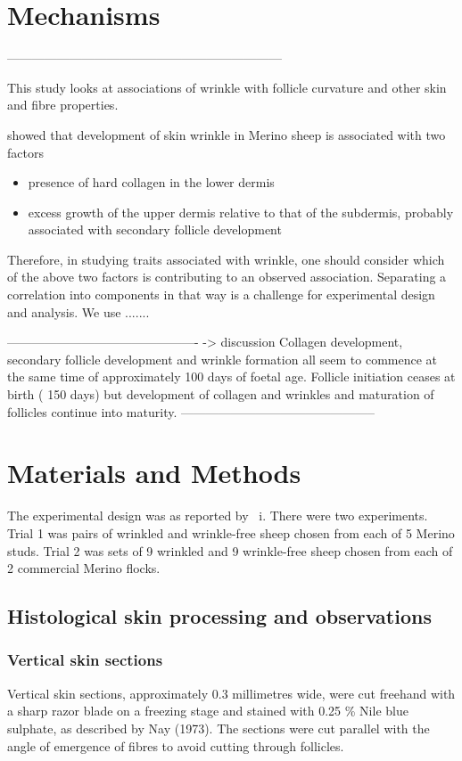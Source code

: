 \documentclass{article}
\begin{document}
\section{Mechanisms}

------------------------------------------------------------------

This study looks at associations of wrinkle with follicle curvature and other skin and fibre properties. 

\cite{watts-2020} showed that development of skin wrinkle in Merino sheep is associated with two factors
\begin{itemize}
\item presence of hard collagen in the lower dermis 
\item excess growth of the upper dermis relative to that of the subdermis, probably associated with secondary follicle development
\end{itemize}

Therefore, in studying traits associated with wrinkle, one should consider which of the above two factors is contributing to an observed association. Separating a correlation into components in that way is a challenge for experimental design and analysis.  We use .......

----------------------------------------------  -> discussion
Collagen development, secondary follicle development and wrinkle formation  all seem to commence at the same time of approximately 100 days of foetal age.  Follicle initiation ceases at birth ( 150 days) but development of collagen and wrinkles  and maturation of follicles continue into maturity. 
-----------------------------------------------

\section{Materials and Methods}
The experimental design was as reported by ~\cite{watts-2020}i. There were  two experiments. Trial 1 was pairs of wrinkled and wrinkle-free sheep chosen from each of 5 Merino studs. Trial 2 was sets of 9 wrinkled and 9 wrinkle-free sheep chosen from each of 2 commercial Merino flocks.

\subsection{Histological skin processing and observations}

\subsubsection{Vertical skin sections}
Vertical skin sections, approximately 0.3 millimetres wide, were cut freehand with a sharp razor blade on a freezing stage and stained with 0.25 \% Nile blue sulphate, as described by Nay (1973).  The sections were cut parallel with the angle of emergence of fibres to avoid cutting through follicles.
\end{document}
